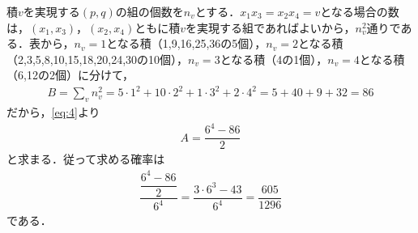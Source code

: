 \documentclass[../../main.tex]{subfiles}
\begin{document}
積$v$を実現する$(p,q)$の組の個数を$n_v$とする．$x_1x_3=x_2x_4=v$となる場合の数は，$(x_1,x_3)$，$(x_2,x_4)$ともに積$v$を実現する組であればよいから，$n_v^2$通りである．表から，$n_v=1$となる積（1,9,16,25,36の5個），$n_v=2$となる積（2,3,5,8,10,15,18,20,24,30の10個），$n_v=3$となる積（4の1個），$n_v=4$となる積（6,12の2個）に分けて，
\begin{align}
  B=\sum_vn_v^2=5\cdot1^2+10\cdot2^2+1\cdot3^2+2\cdot4^2=5+40+9+32=86
\end{align}
だから，\cref{eq:4}より
\begin{align}
  A=\dfrac{6^4-86}{2}
\end{align}
と求まる．従って求める確率は
\begin{align}
  \dfrac{\dfrac{6^4-86}{2}}{6^4}=\dfrac{3\cdot6^3-43}{6^4}=\dfrac{605}{1296}
\end{align}
である．
\end{document}
